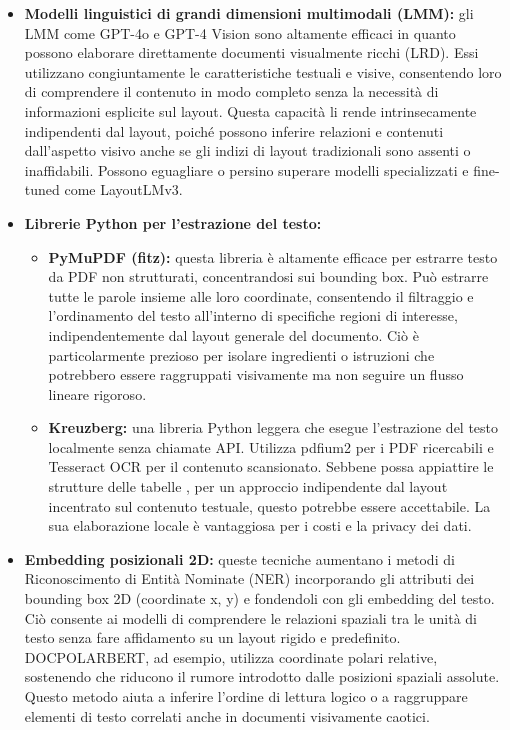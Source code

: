 \documentclass[a4paper, 11pt]{article}
\begin{document}
\begin{itemize}
    \item \textbf{Modelli linguistici di grandi dimensioni multimodali (LMM):} gli LMM come GPT-4o e GPT-4 Vision sono altamente efficaci in quanto possono elaborare direttamente documenti visualmente ricchi (LRD). \cite{amazon_science_heterogenous} Essi utilizzano congiuntamente le caratteristiche testuali e visive, consentendo loro di comprendere il contenuto in modo completo senza la necessità di informazioni esplicite sul layout. \cite{problem_solved_layout_extraction} Questa capacità li rende intrinsecamente indipendenti dal layout, poiché possono inferire relazioni e contenuti dall'aspetto visivo anche se gli indizi di layout tradizionali sono assenti o inaffidabili. Possono eguagliare o persino superare modelli specializzati e fine-tuned come LayoutLMv3. \cite{problem_solved_layout_extraction}
    \item \textbf{Librerie Python per l'estrazione del testo:}
    \begin{itemize}
        \item \textbf{PyMuPDF (fitz):} questa libreria è altamente efficace per estrarre testo da PDF non strutturati, concentrandosi sui bounding box. \cite{analytics_vidhya_pdf_extraction} Può estrarre tutte le parole insieme alle loro coordinate, consentendo il filtraggio e l'ordinamento del testo all'interno di specifiche regioni di interesse, indipendentemente dal layout generale del documento. \cite{analytics_vidhya_pdf_extraction} Ciò è particolarmente prezioso per isolare ingredienti o istruzioni che potrebbero essere raggruppati visivamente ma non seguire un flusso lineare rigoroso.
        \item \textbf{Kreuzberg:} una libreria Python leggera che esegue l'estrazione del testo localmente senza chiamate API. \cite{medium_kreuzberg} Utilizza pdfium2 per i PDF ricercabili e Tesseract OCR per il contenuto scansionato. Sebbene possa appiattire le strutture delle tabelle \cite{medium_kreuzberg}, per un approccio indipendente dal layout incentrato sul contenuto testuale, questo potrebbe essere accettabile. La sua elaborazione locale è vantaggiosa per i costi e la privacy dei dati.
    \end{itemize}
    \item \textbf{Embedding posizionali 2D:} queste tecniche aumentano i metodi di Riconoscimento di Entità Nominate (NER) incorporando gli attributi dei bounding box 2D (coordinate x, y) e fondendoli con gli embedding del testo. \cite{problem_solved_layout_extraction} Ciò consente ai modelli di comprendere le relazioni spaziali tra le unità di testo senza fare affidamento su un layout rigido e predefinito. DOCPOLARBERT, ad esempio, utilizza coordinate polari relative, sostenendo che riducono il rumore introdotto dalle posizioni spaziali assolute. \cite{docpolarbert} Questo metodo aiuta a inferire l'ordine di lettura logico o a raggruppare elementi di testo correlati anche in documenti visivamente caotici.

\end{itemize}
\end{document}
